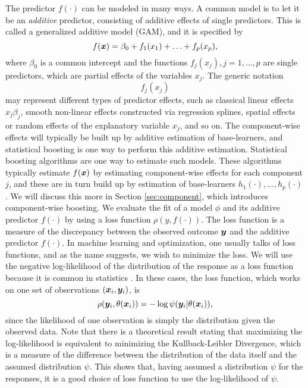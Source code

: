 The predictor $f(\cdot)$ can be modeled in many ways.
A common model is to let it be an \textit{additive} predictor, consisting of additive effects of single predictors.
This is called a generalized additive model (GAM), and it is specified by
\begin{equation}\label{eq:gam}
    f(\bm{x})=\beta_0+f_1(x_1)+\ldots+f_p(x_p),
\end{equation}
where $\beta_0$ is a common intercept and the functions $f_j(x_j),j=1,\ldots,p$ are single predictors, which are partial effects of the variables $x_j$.
The generic notation
\begin{equation*}
    f_j(x_j)
\end{equation*}
may represent different types of predictor effects, such as classical linear effects $x_j\beta_j$, smooth non-linear effects constructed via regression splines, spatial effects or random effects of the explanatory variable $x_j$, and so on. 
The component-wise effects will typically be built up by additive estimation of base-learners, and statistical boosting is one way to perform this additive estimation.
Statistical boosting algorithms are one way to estimate such models.
These algorithms typically estimate $f(\bm{x})$ by estimating component-wise effects for each component $j$, and these are in turn build up by estimation of base-learners $h_1(\cdot),\ldots,h_p(\cdot)$.
We will discuss this more in Section \ref{sec:component}, which introduces component-wise boosting.
We evaluate the fit of a model $\phi$ and its additive predictor $f(\cdot)$ by using a loss function $\rho(y,f(\cdot))$.
The loss function is a measure of the discrepancy between the observed outcome $\bm{y}$ and the additive predictor $f(\cdot)$.
In machine learning and optimization, one usually talks of loss functions, and as the name suggests, we wish to minimize the loss.
We will use the negative log-likelihood of the distribution of the response as a loss function because it is common in statistics \citep{mayr14a}.
In these cases, the loss function, which works on one set of observations $(\bm{x}_i,\bm{y}_i)$, is
\begin{equation*}
    \rho(\bm{y}_i,\theta(\bm{x}_i))=-\log{\psi(\bm{y}_i|\theta(\bm{x}_i))},
\end{equation*}
since the likelihood of one observation is simply the distribution given the observed data.
Note that there is a theoretical result stating that maximizing the log-likelihood is equivalent to minimizing the Kullback-Leibler Divergence, which is a measure of the difference between the distribution of the data itself and the assumed distribution $\psi$.
This shows that, having assumed a distribution $\psi$ for the responses, it is a good choice of loss function to use the log-likelihood of $\psi$.

